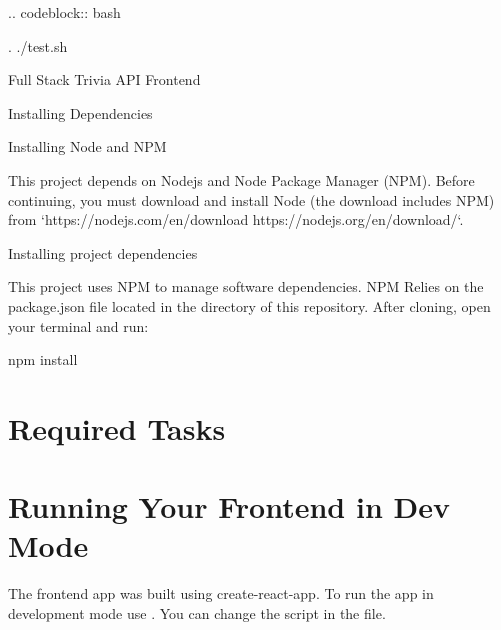 \documentclass[letterpaper,10pt,english]{sphinxmanual}
\begin{document}
\begin{sphinxVerbatim}[commandchars=\\\{\}]
.. code\PYGZhy{}block:: bash

   . ./test.sh

Full Stack Trivia API Frontend
\PYGZhy{}\PYGZhy{}\PYGZhy{}\PYGZhy{}\PYGZhy{}\PYGZhy{}\PYGZhy{}\PYGZhy{}\PYGZhy{}\PYGZhy{}\PYGZhy{}\PYGZhy{}\PYGZhy{}\PYGZhy{}\PYGZhy{}\PYGZhy{}\PYGZhy{}\PYGZhy{}\PYGZhy{}\PYGZhy{}\PYGZhy{}\PYGZhy{}\PYGZhy{}\PYGZhy{}\PYGZhy{}\PYGZhy{}\PYGZhy{}\PYGZhy{}\PYGZhy{}\PYGZhy{}

Installing Dependencies
\PYGZca{}\PYGZca{}\PYGZca{}\PYGZca{}\PYGZca{}\PYGZca{}\PYGZca{}\PYGZca{}\PYGZca{}\PYGZca{}\PYGZca{}\PYGZca{}\PYGZca{}\PYGZca{}\PYGZca{}\PYGZca{}\PYGZca{}\PYGZca{}\PYGZca{}\PYGZca{}\PYGZca{}\PYGZca{}\PYGZca{}

Installing Node and NPM
\PYGZti{}\PYGZti{}\PYGZti{}\PYGZti{}\PYGZti{}\PYGZti{}\PYGZti{}\PYGZti{}\PYGZti{}\PYGZti{}\PYGZti{}\PYGZti{}\PYGZti{}\PYGZti{}\PYGZti{}\PYGZti{}\PYGZti{}\PYGZti{}\PYGZti{}\PYGZti{}\PYGZti{}\PYGZti{}\PYGZti{}

This project depends on Nodejs and Node Package Manager (NPM). Before continuing, you must download and install Node (the download includes NPM) from {}`https://nodejs.com/en/download \PYGZlt{}https://nodejs.org/en/download/\PYGZgt{}{}`\PYGZus{}.

Installing project dependencies
\PYGZti{}\PYGZti{}\PYGZti{}
\end{sphinxVerbatim}

This project uses NPM to manage software dependencies. NPM Relies on the package.json file located in the  directory of this repository. After cloning, open your terminal and run:

\begin{sphinxVerbatim}[commandchars=\\\{\}]
npm install
\end{sphinxVerbatim}


\section{Required Tasks}
\label{\detokenize{index:required-tasks}}

\section{Running Your Frontend in Dev Mode}
\label{\detokenize{index:running-your-frontend-in-dev-mode}}
The frontend app was built using create-react-app. To run the app in development mode use . You can change the script in the  file.
\end{document}
